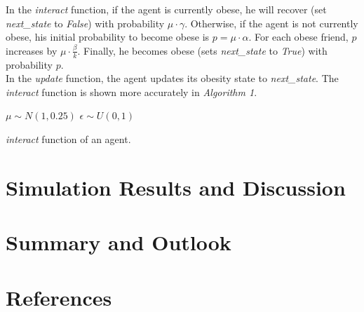 \documentclass[11pt]{article}
\begin{document}
In the \textit{interact} function, if the agent is currently obese, he will recover (set \textit{next\_state} to \textit{False}) with probability \(\mu \cdot \gamma\). 
Otherwise, if the agent is not currently obese, his initial probability to become obese is \(p = \mu \cdot \alpha\). 
For each obese friend, \(p\) increases by \(\mu \cdot \frac{\beta}{k}\). Finally, he becomes obese (sets \textit{next\_state} to \textit{True}) with probability \(p\). \\

In the \textit{update} function, the agent updates its obesity state to \textit{next\_state}. The \textit{interact} function is shown more accurately in \textit{Algorithm 1}.

\begin{algorithm}[h]

    \(\mu \sim N(1, 0.25)\)\;
    \(\epsilon \sim U(0, 1)\)\;
    \caption{{\textit{interact} function of an agent.} \label{Algorithm}}
\end{algorithm}

\section{Simulation Results and Discussion}

\section{Summary and Outlook}

\newpage

\section{References}



\end{document}
